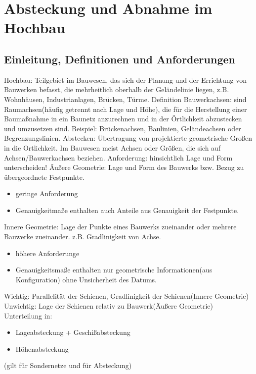 \documentclass[12pt]{article}
\begin{document}
	\pagestyle{main}
\tableofcontents
\newpage
\section{Absteckung und Abnahme im Hochbau}	
\subsection{Einleitung, Definitionen und Anforderungen}
Hochbau: Teilgebiet im Bauwesen, das sich der Planung und der Errichtung von Bauwerken befasst, die mehrheitlich oberhalb der Geländelinie liegen, z.B. Wohnhäusen, Industrianlagen, Brücken, Türme. \newline
\newline
Definition Bauwerkachsen: sind Raumachsen(häufig getrennt nach Lage und Höhe), die für die Herstellung einer Baumaßnahme in ein Baunetz anzurechnen und in der Örtlichkeit abzustecken und umzusetzen sind. Beispiel: Brückenachsen, Baulinien, Geländeachsen oder Begrenzungslinien.\newline 
\newline
Abstecken: Übertragung von projektierte geometrische Großen in die Ortlichkeit. Im Bauwesen meist Achsen oder Größen, die sich auf Achsen/Bauwerkachsen beziehen.\newline
\newline
Anforderung: hinsichtlich Lage und Form unterscheiden!\newline
\newline
Äußere Geometrie: Lage und Form des Bauwerks bzw. Bezug zu übergeordnete Festpunkte.
\begin{itemize}
\item geringe Anforderung
\item Genauigkeitmaße enthalten auch Anteile aus Genauigkeit der Festpunkte.  
\end{itemize}
Innere Geometrie: Lage der Punkte eines Bauwerks zueinander oder mehrere Bauwerke zueinander. z.B. Gradlinigkeit von Achse.
\begin{itemize}
\item höhere Anforderunge
\item Genauigkeitsmaße enthalten nur geometrische Informationen(aus Konfiguration) ohne Unsicherheit des Datums.
\end{itemize}
Wichtig: Parallelität der Schienen, Gradlinigkeit der Schienen(Innere Geometrie)\newline
Unwichtig: Lage der Schienen relativ zu Bauwerk(Äußere Geometrie)\newline
\newline
Unterteilung in:
\begin{itemize}
\item Lageabsteckung + Geschißabsteckung 
\item Höhenabsteckung
\end{itemize}
(gilt für Sondernetze und für Absteckung)
\end{document}
